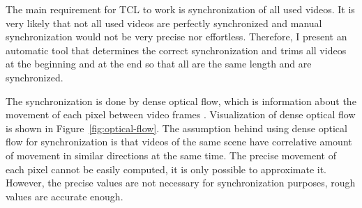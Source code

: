 The main requirement for TCL to work is synchronization of all used videos. It is very likely that not all used videos are perfectly synchronized and manual synchronization would not be very precise nor effortless. Therefore, I present an automatic tool that determines the correct synchronization and trims all videos at the beginning and at the end so that all are the same length and are synchronized.

The synchronization is done by dense optical flow, which is information about the movement of each pixel between video frames \cite{HORN1981185}. Visualization of dense optical flow is shown in Figure~\ref{fig:optical-flow}. The assumption behind using dense optical flow for synchronization is that videos of the same scene have correlative amount of movement in similar directions at the same time. The precise movement of each pixel cannot be easily computed, it is only possible to approximate it. However, the precise values are not necessary for synchronization purposes, rough values are accurate enough.

